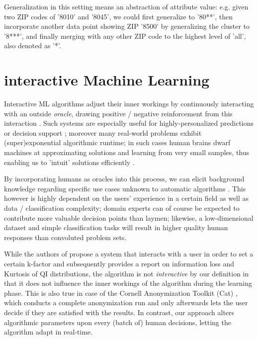 \documentclass{llncs}
\begin{document}
Generalization in this setting means an abstraction of attribute value: e.g. given two ZIP codes of '8010' and '8045', we could first generalize to '80**', then incorporate another data point showing ZIP '8500' by generalizing the cluster to '8***', and finally merging with any other ZIP code to the highest level of 'all', also denoted as '*'.


\section{interactive Machine Learning}
\label{sect:iML}

Interactive ML algorithms adjust their inner workings by continuously interacting with an outside \textit{oracle}, drawing positive / negative reinforcement from this interaction \cite{Holzinger:2016:iML}. Such systems are especially useful for highly-personalized predictions or decision support \cite{Kieseberg:2016:Doctor-in-the-Loop}; moreover many real-world problems exhibit (super)exponential algorithmic runtime; in such cases human brains dwarf machines at approximating solutions and learning from very small samples, thus enabling us to 'intuit' solutions efficiently \cite{iMLExperiment}.

By incorporating humans as oracles into this process, we can elicit background knowledge regarding specific use cases unknown to automatic algorithms \cite{WARE2001}. This however is highly dependent on the users' experience in a certain field as well as data / classification complexity; domain experts can of course be expected to contribute more valuable decision points than laymen; likewise, a low-dimensional dataset and simple classification tasks will result in higher quality human responses than convoluted problem sets.

While the authors of \cite{Moque2012} propose a system that interacts with a user in order to set a certain k-factor and subsequently provides a report on information loss and Kurtosis of QI distributions, the algorithm is not \textit{interactive} by our definition in that it does not influence the inner workings of the algorithm during the learning phase. This is also true in case of the Cornell Anonymization Toolkit (Cat) \cite{Xiao2009}, which conducts a complete anonymization run and only afterwards lets the user decide if they are satisfied with the results. In contrast, our approach alters algorithmic parameters upon every (batch of) human decisions, letting the algorithm adapt in real-time.
\end{document}
